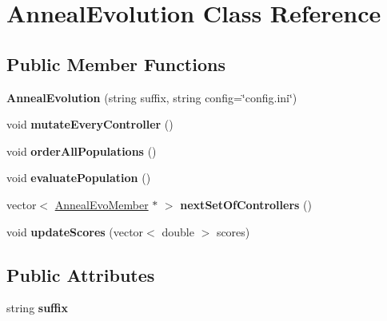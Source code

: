 \hypertarget{class_anneal_evolution}{\section{Anneal\-Evolution Class Reference}
\label{class_anneal_evolution}
}
\subsection*{Public Member Functions}
\begin{DoxyCompactItemize}
\item 
\hypertarget{class_anneal_evolution_a3b76181520ac1449a1fbe302c83c5ef6}{{\bfseries Anneal\-Evolution} (string suffix, string config=\char`\"{}config.\-ini\char`\"{})}\label{class_anneal_evolution_a3b76181520ac1449a1fbe302c83c5ef6}

\item 
\hypertarget{class_anneal_evolution_acc1b2c6484762962eac3a8121c33990f}{void {\bfseries mutate\-Every\-Controller} ()}\label{class_anneal_evolution_acc1b2c6484762962eac3a8121c33990f}

\item 
\hypertarget{class_anneal_evolution_a54c20d2a6119dbca9ad65604cbc1d769}{void {\bfseries order\-All\-Populations} ()}\label{class_anneal_evolution_a54c20d2a6119dbca9ad65604cbc1d769}

\item 
\hypertarget{class_anneal_evolution_a49806407046d51576e508080baf956fd}{void {\bfseries evaluate\-Population} ()}\label{class_anneal_evolution_a49806407046d51576e508080baf956fd}

\item 
\hypertarget{class_anneal_evolution_a3e7a472b3cfbbedbf061648c186d46d9}{vector$<$ \hyperlink{class_anneal_evo_member}{Anneal\-Evo\-Member} $\ast$ $>$ {\bfseries next\-Set\-Of\-Controllers} ()}\label{class_anneal_evolution_a3e7a472b3cfbbedbf061648c186d46d9}

\item 
\hypertarget{class_anneal_evolution_a0d67a2b2103b4c6ce100da98553ca642}{void {\bfseries update\-Scores} (vector$<$ double $>$ scores)}\label{class_anneal_evolution_a0d67a2b2103b4c6ce100da98553ca642}

\end{DoxyCompactItemize}
\subsection*{Public Attributes}
\begin{DoxyCompactItemize}
\item 
\hypertarget{class_anneal_evolution_a97277a51ba42967c2cf479173543af7a}{string {\bfseries suffix}}\label{class_anneal_evolution_a97277a51ba42967c2cf479173543af7a}

\end{DoxyCompactItemize}


